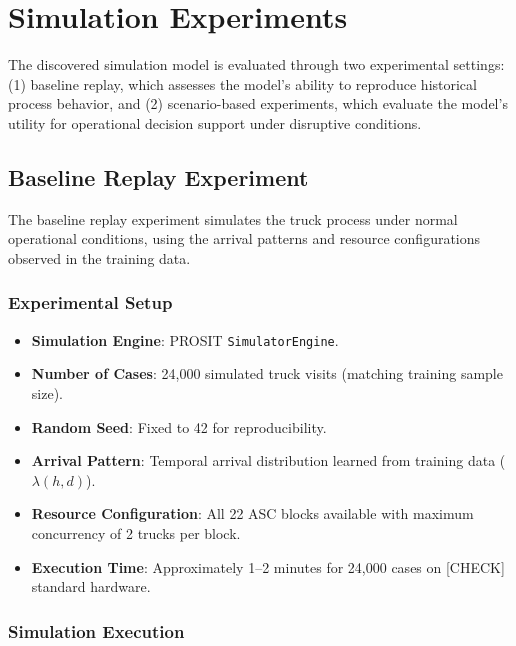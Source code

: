 \section{Simulation Experiments}

The discovered simulation model is evaluated through two experimental settings: (1) baseline replay, which assesses the model's ability to reproduce historical process behavior, and (2) scenario-based experiments, which evaluate the model's utility for operational decision support under disruptive conditions.

\subsection{Baseline Replay Experiment}

The baseline replay experiment simulates the truck process under normal operational conditions, using the arrival patterns and resource configurations observed in the training data.

        \subsubsection{Experimental Setup}
        
        \begin{itemize}
            \item \textbf{Simulation Engine}: PROSIT \texttt{SimulatorEngine}.
            \item \textbf{Number of Cases}: 24,000 simulated truck visits (matching training sample size).
            \item \textbf{Random Seed}: Fixed to 42 for reproducibility.
            \item \textbf{Arrival Pattern}: Temporal arrival distribution learned from training data ($\lambda(h, d)$).
            \item \textbf{Resource Configuration}: All 22 ASC blocks available with maximum concurrency of 2 trucks per block.
            \item \textbf{Execution Time}: Approximately 1--2 minutes for 24,000 cases on [CHECK] standard hardware.
        \end{itemize}

        \subsubsection{Simulation Execution}
        
